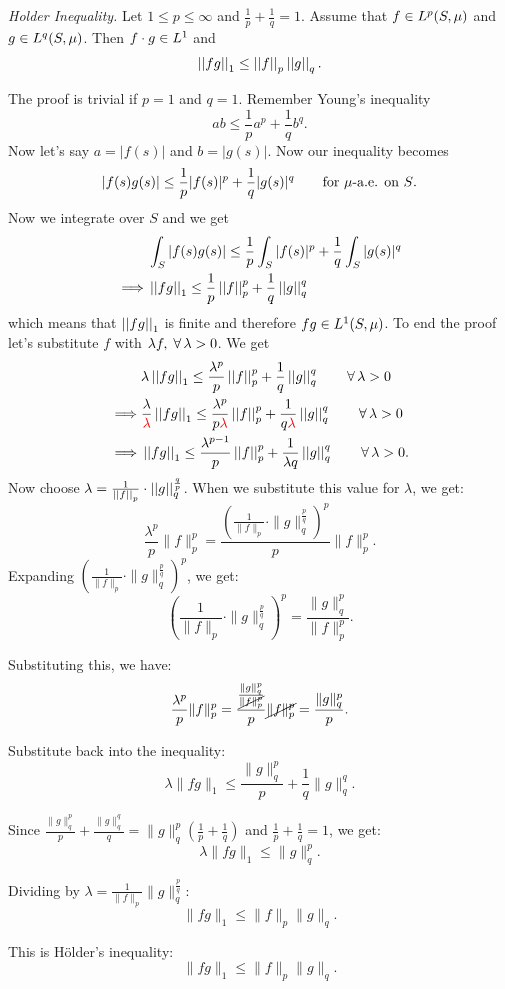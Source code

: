 \documentclass{article}
\begin{document}
\begin{theorem}
    \emph{Holder Inequality.} Let $1\leq p\leq\infty$ and $\frac{1}{p}+\frac{1}{q}=1$. Assume that $f\in L^{p}(S,\mu)$ and $g\in L^{q}(S,\mu)$. Then $f\cdot g\in L^{1}$ and
    \begin{equation*}
        \left|\left|fg\right|\right|_1\leq\left|\left|f\right|\right|_p\left|\left|g\right|\right|_q.
    \end{equation*}
\end{theorem}
\begin{fancyproof}
    The proof is trivial if $p=1$ and $q=1$. Remember Young's inequality 
    \[
    ab\leq\frac{1}{p}a^p+\frac{1}{q}b^q.
    \]
    Now let's say $a=|f(s)|$ and $b=|g(s)|$. Now our inequality becomes
    \[
    |f(s)g(s)|\leq\frac{1}{p}|f(s)|^p+\frac{1}{q}|g(s)|^q\qquad\text{for $\mu$-a.e. on $S$}.
    \]
    Now we integrate over $S$ and we get
    \begin{align*}
        &\int_S|f(s)g(s)|\leq\frac{1}{p}\int_S|f(s)|^p+\frac{1}{q}\int_S|g(s)|^q\\
        \implies&\left|\left|fg\right|\right|_1\leq\frac{1}{p}\left|\left|f\right|\right|_p^p+\frac{1}{q}\left|\left|g\right|\right|_q^q
    \end{align*}
    which means that $\left|\left|fg\right|\right|_1$ is finite and therefore $fg\in L^{1}(S,\mu)$. To end the proof let's substitute $f$ with $\lambda f,\;\forall\,\lambda>0$. We get
    \begin{align*}
        &\lambda\left|\left|fg\right|\right|_1\leq\frac{\lambda^p}{p}\left|\left|f\right|\right|_p^p+\frac{1}{q}\left|\left|g\right|\right|_q^q\qquad\forall\,\lambda>0\\
        \implies&\frac{\lambda}{\color{red}\lambda}\left|\left|fg\right|\right|_1\leq\frac{\lambda^p}{p\color{red}\lambda}\left|\left|f\right|\right|_p^p+\frac{1}{q\color{red}\lambda}\left|\left|g\right|\right|_q^q\qquad\forall\,\lambda>0\\
        \implies&\left|\left|fg\right|\right|_1\leq\frac{\lambda^{p-1}}{p}\left|\left|f\right|\right|_p^p+\frac{1}{\lambda q}\left|\left|g\right|\right|_q^q\qquad\forall\,\lambda>0.\\
    \end{align*}
    Now choose $\lambda=\frac{1}{\left|\left|f\right|\right|_p}\cdot\left|\left|g\right|\right|^{\frac{q}{p}}_q$. When we substitute this value for \( \lambda \), we get:
    \[
\frac{\lambda^p}{p} \|f\|_p^p = \frac{\left( \frac{1}{\|f\|_p} \cdot \|g\|_q^{\frac{p}{q}} \right)^p}{p} \|f\|_p^p.
\]
Expanding \( \left( \frac{1}{\|f\|_p} \cdot \|g\|_q^{\frac{p}{q}} \right)^p \), we get:
\[
\left( \frac{1}{\|f\|_p} \cdot \|g\|_q^{\frac{p}{q}} \right)^p = \frac{\|g\|_q^p}{\|f\|_p^p}.
\]

Substituting this, we have:
\[
\frac{\lambda^p}{p} \|f\|_p^p = \frac{\frac{\|g\|_q^p}{\cancel{\|f\|_p^p}}}{p} \cancel{\|f\|_p^p} = \frac{\|g\|_q^p}{p}.
\]

Substitute back into the inequality:
\[
\lambda \|fg\|_1 \leq \frac{\|g\|_q^p}{p} + \frac{1}{q} \|g\|_q^q.
\]

Since \( \frac{\|g\|_q^p}{p} + \frac{\|g\|_q^q}{q} = \|g\|_q^p \left( \frac{1}{p} + \frac{1}{q} \right) \) and \( \frac{1}{p} + \frac{1}{q} = 1 \), we get:
\[
\lambda \|fg\|_1 \leq \|g\|_q^p.
\]


Dividing by \( \lambda = \frac{1}{\|f\|_p} \|g\|_q^{\frac{p}{q}} \):
\[
\|fg\|_1 \leq \|f\|_p \|g\|_q.
\]

This is Hölder’s inequality:
\[
\|fg\|_1 \leq \|f\|_p \|g\|_q.
\]

\end{fancyproof}
\end{document}
